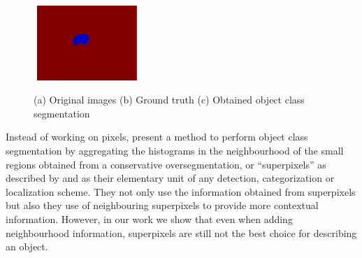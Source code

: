 \documentclass[twoside,11pt]{article}
\begin{document}
\begin{figure}[!t]
{    \includegraphics[width=115pt,height=80pt]{./Figures/gt4.eps}
    \label{fig:classseggt}
}\\
\caption{(a) Original images (b) Ground truth
(c) Obtained object class segmentation}
\label{fig:obj_seg}
\end{figure}

Instead of working on pixels, \cite{fulkerson09class} present a method to
perform
object class segmentation by aggregating the histograms in the neighbourhood of
the small regions obtained from a conservative oversegmentation, or
``superpixels''
as described by \cite{Ren03learninga} and \cite{4587471} as their elementary unit
of
any detection, categorization or localization scheme. They not only use the
information obtained from superpixels but also they use of neighbouring
superpixels to provide more contextual information. However, in our work we show
that even when adding neighbourhood information, superpixels are still not
the best choice for describing an object.
\end{document}
